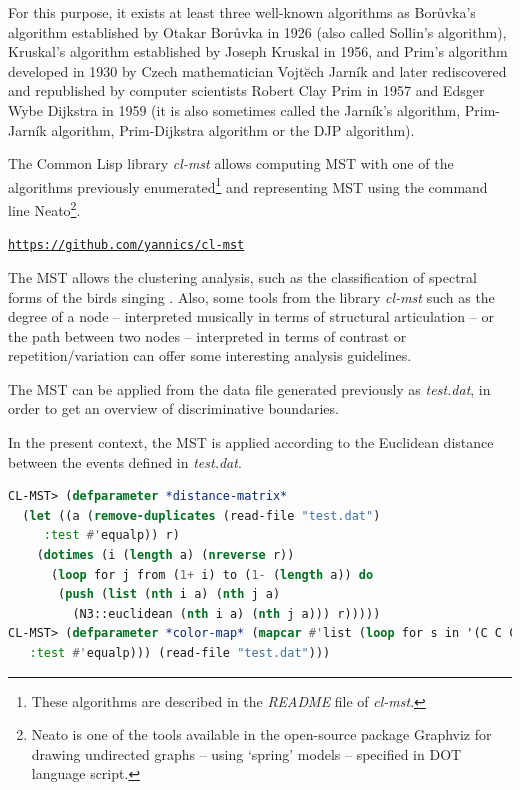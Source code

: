 For this purpose, it exists at least three well-known algorithms as Bor\r{u}vka's algorithm established by Otakar Bor\r{u}vka in 1926 (also called Sollin's algorithm), Kruskal's algorithm established by Joseph Kruskal in 1956, and Prim's algorithm developed in 1930 by Czech mathematician Vojt\u{e}ch Jarn\'ik and later rediscovered and republished by computer scientists Robert Clay Prim in 1957 and Edsger Wybe Dijkstra in 1959 (it is also sometimes called the Jarn\'ik's algorithm, Prim-Jarn\'ik algorithm, Prim-Dijkstra algorithm or the DJP algorithm).

\bigskip

The Common Lisp library \textsl{cl-mst} allows computing MST with one of the algorithms previously enumerated\footnote{These algorithms are described in the \textsl{README} file of \textsl{cl-mst}.} and representing MST using the command line Neato\footnote{Neato is one of the tools available in the open-source package Graphviz for drawing undirected graphs -- 	 using `spring' models \citep{kek} -- specified in DOT language script.\label{neato}}.

\href{https://github.com/yannics/cl-mst}{\texttt{\small https://github.com/yannics/cl-mst}}

\bigskip

The MST allows the clustering analysis, such as the classification of spectral forms of the birds singing \citep{deec}. Also, some tools from the library \textsl{cl-mst} such as the degree of a node -- interpreted musically in terms of structural articulation -- or the path between two nodes -- interpreted in terms of contrast or repetition/variation can offer some interesting analysis guidelines.

\bigskip

The MST can be applied from the data file generated previously as \textsl{test.dat}, in order to get an overview of discriminative boundaries.

In the present context, the MST is applied according to the Euclidean distance between the events defined in \textsl{test.dat}. 

\smallskip

\begin{lstlisting}[language=Lisp]
CL-MST> (defparameter *distance-matrix*
  (let ((a (remove-duplicates (read-file "test.dat") 
     :test #'equalp)) r)
    (dotimes (i (length a) (nreverse r))
      (loop for j from (1+ i) to (1- (length a)) do
	   (push (list (nth i a) (nth j a)
		 (N3::euclidean (nth i a) (nth j a))) r)))))
CL-MST> (defparameter *color-map* (mapcar #'list (loop for s in '(C C C A A C C D D A C B C A A E C D D A C A A B B B B B B E B B B D A C A A E B B B B B E E B B B B A C D E A A E A A C B B B B E A A A A B B A D A B C C A C E C D D A C D B A E C D A A A B B E A A E B A D A E D E A A E A D D C C B E A B B C E B D A B D A A E B A A A B B E A A B C D B B) collect (cadr (assoc s '((A coral) (B chartreuse4) (C dodgerblue2) (D darkorchid1) (E sienna)) 
   :test #'equalp))) (read-file "test.dat")))	     
\end{lstlisting}

